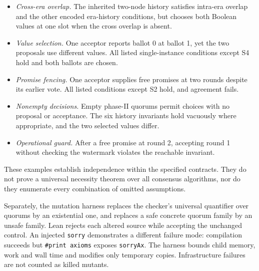 \documentclass[10pt,journal,letterpaper]{IEEEtran}
\newcommand{\code}[1]{\texttt{\small #1}}
\begin{document}
\begin{itemize}
\item \emph{Cross-era overlap.} The inherited two-node history satisfies
      intra-era overlap and the other encoded era-history conditions, but
      chooses both Boolean values at one slot when the cross overlap is absent.
\item \emph{Value selection.} One acceptor reports ballot 0 at ballot 1,
      yet the two proposals use different values. All listed single-instance
      conditions except S4 hold and both ballots are chosen.
\item \emph{Promise fencing.} One acceptor supplies free promises at two
      rounds despite its earlier vote. All listed conditions except S2 hold,
      and agreement fails.
\item \emph{Nonempty decisions.} Empty phase-II quorums permit choices with
      no proposal or acceptance. The six history invariants hold vacuously
      where appropriate, and the two selected values differ.
\item \emph{Operational guard.} After a free promise at round 2, accepting
      round 1 without checking the watermark violates the reachable invariant.
\end{itemize}
These examples establish independence within the specified contracts.
They do not prove a universal necessity theorem over all consensus algorithms,
nor do they enumerate every combination of omitted assumptions.

Separately, the mutation harness replaces the checker's universal quantifier
over quorums by an existential one, and replaces a safe concrete quorum family
by an unsafe family. Lean rejects each altered source while accepting the
unchanged control. An injected \code{sorry} demonstrates a different failure
mode: compilation succeeds but \code{\#print axioms} exposes \code{sorryAx}.
The harness bounds child memory, work and wall time and modifies only temporary
copies. Infrastructure failures are not counted as killed mutants.
\end{document}

